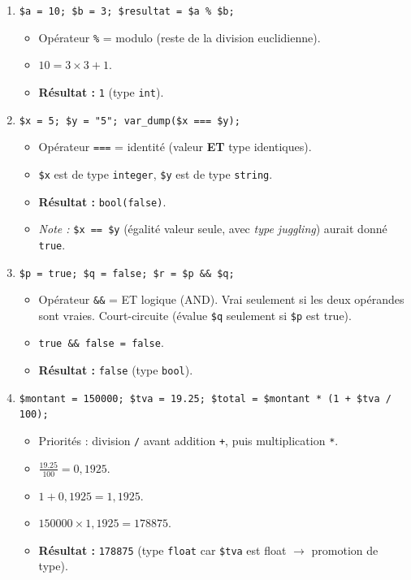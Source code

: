 \documentclass[11pt]{article}
\begin{document}
\begin{corrige}

\begin{enumerate}
    \item \texttt{\$a = 10; \$b = 3; \$resultat = \$a \% \$b;}
    \begin{itemize}
        \item Opérateur \texttt{\%} = modulo (reste de la division euclidienne).
        \item $10 = 3 \times 3 + 1$.
        \item \textbf{Résultat :} \texttt{1} (type \texttt{int}).
    \end{itemize}

    \item \texttt{\$x = 5; \$y = "5"; var\_dump(\$x === \$y);}
    \begin{itemize}
        \item Opérateur \texttt{===} = identité (valeur \textbf{ET} type identiques).
        \item \texttt{\$x} est de type \texttt{integer}, \texttt{\$y} est de type \texttt{string}.
        \item \textbf{Résultat :} \texttt{bool(false)}.
        \item \emph{Note :} \texttt{\$x == \$y} (égalité valeur seule, avec \emph{type juggling}) aurait donné \texttt{true}.
    \end{itemize}

    \item \texttt{\$p = true; \$q = false; \$r = \$p \&\& \$q;}
    \begin{itemize}
        \item Opérateur \texttt{\&\&} = ET logique (AND). Vrai seulement si les deux opérandes sont vraies. Court-circuite (évalue \texttt{\$q} seulement si \texttt{\$p} est true).
        \item \texttt{true \&\& false = false}.
        \item \textbf{Résultat :} \texttt{false} (type \texttt{bool}).
    \end{itemize}

    \item \texttt{\$montant = 150000; \$tva = 19.25; \$total = \$montant * (1 + \$tva / 100);}
    \begin{itemize}
        \item Priorités : division \texttt{/} avant addition \texttt{+}, puis multiplication \texttt{*}.
        \item $\frac{19.25}{100} = 0,1925$.
        \item $1 + 0,1925 = 1,1925$.
        \item $150000 \times 1,1925 = 178875$.
        \item \textbf{Résultat :} \texttt{178875} (type \texttt{float} car \texttt{\$tva} est float $\rightarrow$ promotion de type).
    \end{itemize}
\end{enumerate}
\end{corrige}
\end{document}
